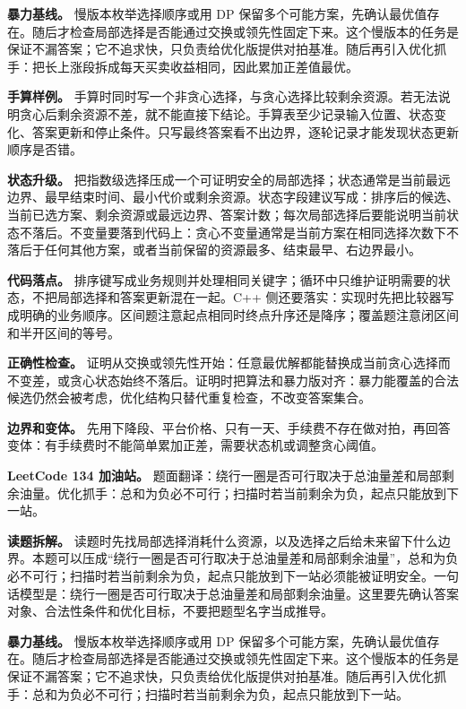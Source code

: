 \textbf{暴力基线。} 慢版本枚举选择顺序或用 DP 保留多个可能方案，先确认最优值存在。随后才检查局部选择是否能通过交换或领先性固定下来。这个慢版本的任务是保证不漏答案；它不追求快，只负责给优化版提供对拍基准。随后再引入优化抓手：把长上涨段拆成每天买卖收益相同，因此累加正差值最优。

\textbf{手算样例。} 手算时同时写一个非贪心选择，与贪心选择比较剩余资源。若无法说明贪心后剩余资源不差，就不能直接下结论。手算表至少记录输入位置、状态变化、答案更新和停止条件。只写最终答案看不出边界，逐轮记录才能发现状态更新顺序是否错。

\textbf{状态升级。} 把指数级选择压成一个可证明安全的局部选择；状态通常是当前最远边界、最早结束时间、最小代价或剩余资源。状态字段建议写成：排序后的候选、当前已选方案、剩余资源或最远边界、答案计数；每次局部选择后要能说明当前状态不落后。不变量要落到代码上：贪心不变量通常是当前方案在相同选择次数下不落后于任何其他方案，或者当前保留的资源最多、结束最早、右边界最小。

\textbf{代码落点。} 排序键写成业务规则并处理相同关键字；循环中只维护证明需要的状态，不把局部选择和答案更新混在一起。C++ 侧还要落实：实现时先把比较器写成明确的业务顺序。区间题注意起点相同时终点升序还是降序；覆盖题注意闭区间和半开区间的等号。

\textbf{正确性检查。} 证明从交换或领先性开始：任意最优解都能替换成当前贪心选择而不变差，或贪心状态始终不落后。证明时把算法和暴力版对齐：暴力能覆盖的合法候选仍然会被考虑，优化结构只替代重复检查，不改变答案集合。

\textbf{边界和变体。} 先用下降段、平台价格、只有一天、手续费不存在做对拍，再回答变体：有手续费时不能简单累加正差，需要状态机或调整贪心阈值。

\noindent\textbf{LeetCode 134 加油站。} 题面翻译：绕行一圈是否可行取决于总油量差和局部剩余油量。优化抓手：总和为负必不可行；扫描时若当前剩余为负，起点只能放到下一站。

\textbf{读题拆解。} 读题时先找局部选择消耗什么资源，以及选择之后给未来留下什么边界。本题可以压成“绕行一圈是否可行取决于总油量差和局部剩余油量”，总和为负必不可行；扫描时若当前剩余为负，起点只能放到下一站必须能被证明安全。一句话模型是：绕行一圈是否可行取决于总油量差和局部剩余油量。这里要先确认答案对象、合法性条件和优化目标，不要把题型名字当成推导。

\textbf{暴力基线。} 慢版本枚举选择顺序或用 DP 保留多个可能方案，先确认最优值存在。随后才检查局部选择是否能通过交换或领先性固定下来。这个慢版本的任务是保证不漏答案；它不追求快，只负责给优化版提供对拍基准。随后再引入优化抓手：总和为负必不可行；扫描时若当前剩余为负，起点只能放到下一站。

